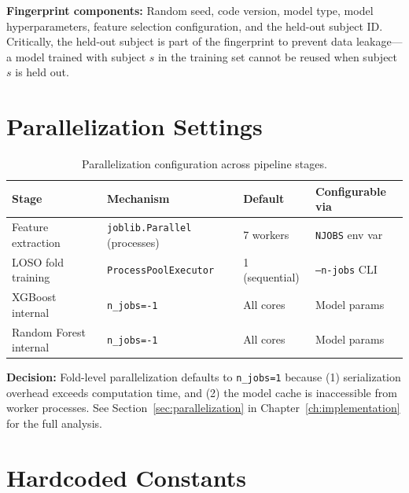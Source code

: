 \textbf{Fingerprint components:} Random seed, code version, model type, model hyperparameters, feature selection configuration, and the held-out subject ID. Critically, the held-out subject is part of the fingerprint to prevent data leakage---a model trained with subject $s$ in the training set cannot be reused when subject $s$ is held out.

\section{Parallelization Settings}
\label{sec:app_parallelization}

\begin{table}[h]
\centering
\caption{Parallelization configuration across pipeline stages.}
\label{tab:parallelization}
\begin{tabular}{l l l l}
\toprule
\textbf{Stage} & \textbf{Mechanism} & \textbf{Default} & \textbf{Configurable via} \\
\midrule
Feature extraction & \texttt{joblib.Parallel} (processes) & 7 workers & \texttt{NJOBS} env var \\
LOSO fold training & \texttt{ProcessPoolExecutor}         & 1 (sequential) & \texttt{--n-jobs} CLI \\
XGBoost internal   & \texttt{n\_jobs=-1}                  & All cores & Model params \\
Random Forest internal & \texttt{n\_jobs=-1}              & All cores & Model params \\
\bottomrule
\end{tabular}
\end{table}

\textbf{Decision:} Fold-level parallelization defaults to \texttt{n\_jobs=1} because (1) serialization overhead exceeds computation time, and (2) the model cache is inaccessible from worker processes. See Section~\ref{sec:parallelization} in Chapter~\ref{ch:implementation} for the full analysis.

\section{Hardcoded Constants}
\label{sec:app_constants}

